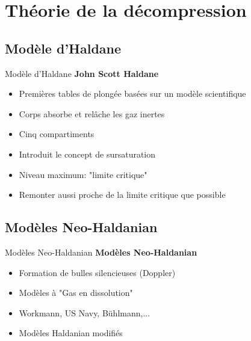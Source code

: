 
\section{Théorie de la décompression}
\subsection{Modèle d'Haldane}

\begin{frame}{Modèle d'Haldane}
	\textbf{John Scott Haldane}
	\begin{itemize}
		\item Premières tables de plongée basées sur un modèle scientifique
		\item Corps absorbe et relâche les gaz inertes
		\item Cinq compartiments
		\item Introduit le concept de sursaturation
		\item Niveau maximum: "limite critique"
		\item Remonter aussi proche de la limite critique que possible
	\end{itemize}
\end{frame}

\subsection{Modèles Neo-Haldanian}

\begin{frame}{Modèles Neo-Haldanian}  
	\textbf{Modèles Neo-Haldanian}
	\begin{itemize}
		\item Formation de bulles silencieuses (Doppler)
		\item Modèles à "Gas en dissolution"
		\item Workmann, US Navy, Bühlmann,...
		\item Modèles Haldanian modifiés
	\end{itemize}
\end{frame}

